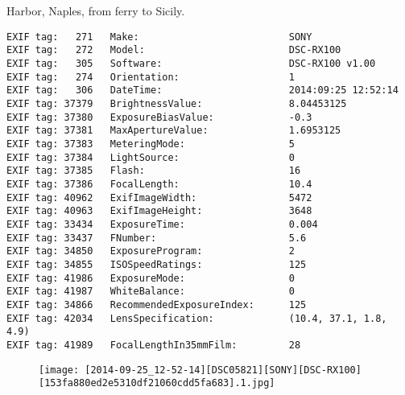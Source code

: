 \section{\protect{}}
\noindent Harbor, Naples, from ferry to Sicily.
\noindent
\begin{lstlisting}
EXIF tag:   271   Make:                          SONY
EXIF tag:   272   Model:                         DSC-RX100
EXIF tag:   305   Software:                      DSC-RX100 v1.00
EXIF tag:   274   Orientation:                   1
EXIF tag:   306   DateTime:                      2014:09:25 12:52:14
EXIF tag: 37379   BrightnessValue:               8.04453125
EXIF tag: 37380   ExposureBiasValue:             -0.3
EXIF tag: 37381   MaxApertureValue:              1.6953125
EXIF tag: 37383   MeteringMode:                  5
EXIF tag: 37384   LightSource:                   0
EXIF tag: 37385   Flash:                         16
EXIF tag: 37386   FocalLength:                   10.4
EXIF tag: 40962   ExifImageWidth:                5472
EXIF tag: 40963   ExifImageHeight:               3648
EXIF tag: 33434   ExposureTime:                  0.004
EXIF tag: 33437   FNumber:                       5.6
EXIF tag: 34850   ExposureProgram:               2
EXIF tag: 34855   ISOSpeedRatings:               125
EXIF tag: 41986   ExposureMode:                  0
EXIF tag: 41987   WhiteBalance:                  0
EXIF tag: 34866   RecommendedExposureIndex:      125
EXIF tag: 42034   LensSpecification:             (10.4, 37.1, 1.8, 4.9)
EXIF tag: 41989   FocalLengthIn35mmFilm:         28

\end{lstlisting}
\clearpage
\begin{figure}
\raggedleft
\texttt{[image: [2014-09-25\_12-52-14][DSC05821][SONY][DSC-RX100][153fa880ed2e5310df21060cdd5fa683].1.jpg]}
\end{figure}


\clearpage
